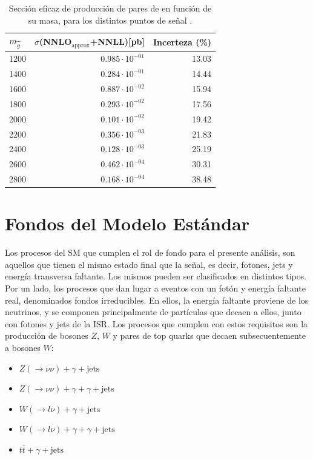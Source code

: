 \begin{table}[ht!]
  \centering
  \caption{Sección eficaz de producción de pares de \gluino en función de su masa, para los distintos puntos de señal \cite{susy_xs_web}.}
  \begin{tabular}{l r r}
  \hline
  \hline
    $m_{\widetilde{g}}$    & $\sigma$(NNLO$_\text{approx}$+NNLL)[pb] &    Incerteza (\%)  \\
    \hline
    \hline
    1200 & $0.985 \cdot 10^{-01}$ & 13.03 \\
    1400 & $0.284 \cdot 10^{-01}$ & 14.44 \\
    1600 & $0.887 \cdot 10^{-02}$ & 15.94 \\
    1800 & $0.293 \cdot 10^{-02}$ & 17.56 \\
    2000 & $0.101 \cdot 10^{-02}$ & 19.42 \\
    2200 & $0.356 \cdot 10^{-03}$ & 21.83 \\
    2400 & $0.128 \cdot 10^{-03}$ & 25.19 \\
    2600 & $0.462 \cdot 10^{-04}$ & 30.31 \\
    2800 & $0.168 \cdot 10^{-04}$ & 38.48 \\
    \hline
    \hline
  \end{tabular}
  \label{tab:gino_xs}
\end{table}





\section{Fondos del Modelo Estándar}\label{sec:sm_backgrounds}


Los procesos del SM que cumplen el rol de fondo para el presente análisis, son aquellos que tienen el mismo estado final que la señal, es decir, fotones, jets y energía transversa faltante. Los mismos pueden ser clasificados en distintos tipos. Por un lado, los procesos que dan lugar a eventos con un fotón y energía faltante real, denominados fondos irreducibles. En ellos, la energía faltante proviene de los neutrinos, y se componen principalmente de partículas que decaen a ellos, junto con fotones y jets de la ISR. Los procesos que cumplen con estos requisitos son la producción de bosones $Z$, $W$ y pares de top quarks que decaen subsecuentemente a bosones $W$:

\begin{itemize}
  \item $Z(\rightarrow \nu\nu) + \gamma + \text{jets}$
  \item $Z(\rightarrow \nu\nu) + \gamma + \gamma + \text{jets}$
  \item $W(\rightarrow l\nu) + \gamma + \text{jets}$
  \item $W(\rightarrow l\nu) + \gamma + \gamma + \text{jets}$
  \item $t\bar{t} + \gamma + \text{jets}$
\end{itemize}

